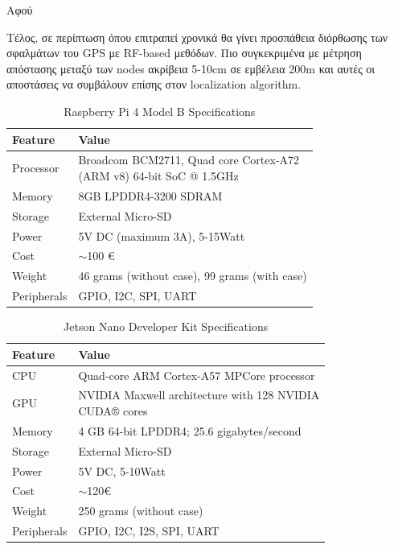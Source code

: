 Αφού 

Τέλος, σε περίπτωση όπου επιτραπεί χρονικά θα γίνει προσπάθεια διόρθωσης των σφαλμάτων του 
GPS με RF-based μεθόδων. Πιο συγκεκριμένα με μέτρηση απόστασης μεταξύ των nodes  
ακρίβεια 5-10cm σε εμβέλεια 200m και αυτές οι αποστάσεις να συμβάλουν επίσης στον localization
algorithm.




\begin{table}[H]
  \caption[]{Raspberry Pi 4 Model B Specifications}
  \label{tab:1}
  \centering
  \begin{tabular}{ll}
      \hline
      \textbf{Feature} & \textbf{Value}  \\
      \hline
          Processor & \Centerstack{Broadcom BCM2711, Quad core Cortex-A72 \\(ARM v8) 64-bit SoC @ 1.5GHz }\\
          Memory & 8GB LPDDR4-3200 SDRAM \\
          Storage & External Micro-SD \\  
          Power & 5V DC (maximum 3A), 5-15Watt \\
          Cost & $\sim$100 €\\
          Weight & 46 grams (without case), 99 grams (with case) \\
          Peripherals & GPIO, I2C, SPI, UART \\
          \hline
  \end{tabular}
\end{table}


\begin{table}[H]
  \caption[]{Jetson Nano Developer Kit Specifications}
  \label{tab:2}
  \centering
  \begin{tabular}{ll}
      \hline
      \textbf{Feature} & \textbf{Value}  \\
      \hline
          CPU & Quad-core ARM Cortex-A57 MPCore processor\\
          GPU & \Centerstack{NVIDIA Maxwell architecture with 128 NVIDIA\\ CUDA® cores} \\
          Memory & 4 GB 64-bit LPDDR4; 25.6 gigabytes/second \\
          Storage & External Micro-SD \\  
          Power & 5V DC, 5-10Watt \\
          Cost & $\sim$120€\\
          Weight & 250 grams (without case)\\
          Peripherals & GPIO, I2C, I2S, SPI, UART \\
          \hline
  \end{tabular}
\end{table}